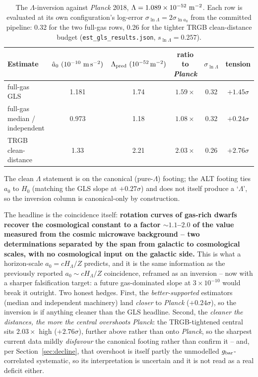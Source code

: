 \documentclass[fleqn,usenatbib]{mnras}
\begin{document}
\begin{table}
\centering
\caption{The $\Lambda$-inversion against \textit{Planck} 2018, $\Lambda=1.089\times10^{-52}\ {\rm m^{-2}}$. Each row is evaluated at its own configuration's log-error $\sigma_{\ln\Lambda}=2\sigma_{\ln a_0}$ from the committed pipeline: 0.32 for the two full-gas rows, 0.26 for the tighter TRGB clean-distance budget (\texttt{est\_gls\_results.json}, $s_{\ln\Lambda}=0.257$).}
\label{tab:lambda}
\begin{tabular}{lccccc}
\hline
Estimate & $\hat a_0\ (10^{-10}\ {\rm m\,s^{-2}})$ & $\Lambda_{\rm pred}\ (10^{-52}\,{\rm m^{-2}})$ & ratio to \textit{Planck} & $\sigma_{\ln\Lambda}$ & tension \\
\hline
full-gas GLS & 1.181 & 1.74 & $1.59\times$ & 0.32 & $+1.45\sigma$ \\
full-gas median / independent & 0.973 & 1.18 & $1.08\times$ & 0.32 & $+0.24\sigma$ \\
TRGB clean-distance & 1.33 & 2.21 & $2.03\times$ & 0.26 & $+2.76\sigma$ \\
\hline
\end{tabular}
\end{table}

The clean $\Lambda$ statement is on the canonical (pure-$\Lambda$) footing; the ALT footing ties $a_0$ to $H_0$ (matching the GLS slope at $+0.27\sigma$) and does not itself produce a `$\Lambda$', so the inversion column is canonical-only by construction.

The headline is the coincidence itself: \textbf{rotation curves of gas-rich dwarfs recover the cosmological constant to a factor ${\sim}1.1$--$2.0$ of the value measured from the cosmic microwave background -- two determinations separated by the span from galactic to cosmological scales, with no cosmological input on the galactic side.} This is what a horizon-scale $a_0=cH_\Lambda/Z$ predicts, and it is the same information as the previously reported $a_0\sim cH_\Lambda/Z$ coincidence, reframed as an inversion -- now with a sharper falsification target: a future gas-dominated slope at $3\times10^{-10}$ would break it outright. Two honest hedges. First, the \emph{better-supported} estimators (median and independent machinery) land \emph{closer} to \textit{Planck} ($+0.24\sigma$), so the inversion is if anything cleaner than the GLS headline. Second, the \emph{cleaner the distances, the more the central overshoots Planck}: the TRGB-tightened central sits $2.03\times$ high ($+2.76\sigma$), further above rather than onto \textit{Planck}, so the sharpest current data mildly \emph{disfavour} the canonical footing rather than confirm it -- and, per Section~\ref{sec:decline}, that overshoot is itself partly the unmodelled $g_{\rm bar}$-correlated systematic, so its interpretation is uncertain and it is not read as a real deficit either.
\end{document}
